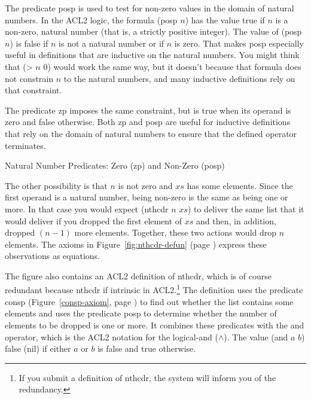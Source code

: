 \begin{aside}
The predicate \textsf{posp} is used to test for non-zero values
in the domain of natural numbers.
In the ACL2 logic, the formula \textsf{(posp $n$)} has the value true if $n$ is
a non-zero, natural number (that is, a strictly positive integer).
The value of \textsf{(posp $n$)} is false if $n$ is not a natural number
or if $n$ is zero.
That makes \textsf{posp} especially useful
in definitions that are inductive on the natural numbers.
You might think that \textsf{(> $n$ 0)} would
work the same way, but it doesn't because that formula
does not constrain $n$ to the natural numbers,
and many inductive definitions rely on that constraint.

The predicate \textsf{zp} imposes the same constraint,
but is true when its operand is zero and false otherwise.
Both \textsf{zp} and \textsf{posp} are useful for inductive definitions that
rely on the domain of natural numbers to ensure that the
defined operator terminates.
\caption{Natural Number Predicates: Zero (\textsf{zp}) and Non-Zero (\textsf{posp})}
\label{zp-def}
\end{aside}

The other possibility is that $n$ is not zero and $xs$ has some elements.
Since the first operand is a natural number,
being non-zero is the same as being one or more.
In that case you would expect \textsf{(nthcdr $n$ $xs$)} to deliver
the same list that it would deliver
if you dropped the first element of $xs$
and then, in addition, dropped $(n - 1)$ more elements.
Together, these two actions would drop $n$ elements.
The axioms in Figure~\ref{fig:nthcdr-defun} (page \pageref{fig:nthcdr-defun})
express these observations as equations.

The figure also contains an ACL2 definition of \textsf{nthcdr}, which
is of course redundant because \textsf{nthcdr} if intrinsic in ACL2.\footnote{If
you submit a definition of \textsf{nthcdr},
the system will inform you of the redundancy.}
The definition uses the predicate \textsf{consp}
(Figure~\ref{consp-axiom}, page \pageref{consp-axiom})
to find out whether the list contains some elements and
uses the predicate
\label{posp-def} \textsf{posp}
to determine whether
the number of elements to be dropped is one or more.
It combines these predicates with the \textsf{and} operator,
which is the ACL2 notation for the logical-and ($\wedge$).
\label{and-op=informal}
The value \textsf{(and $a$ $b$)} false (nil)
if either $a$ or $b$ is false and true otherwise.

